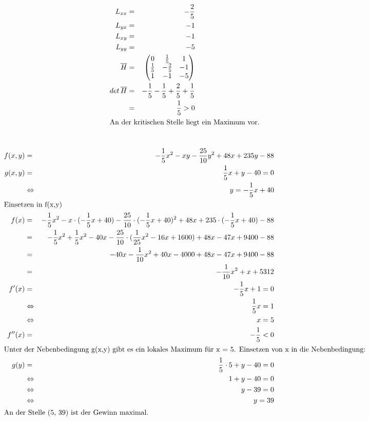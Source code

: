 \documentclass[10pt,a4paper,oneside,ngerman,numbers=noenddot]{scrartcl}
\begin{document}
\subsection{} %
\begin{alignat*}{2}
L_{xx} &=& - \frac{2}{5} \\
L_{yx} &=& - 1 \\
L_{xy} &=& - 1 \\
L_{yy} &=& - 5 \\
\overline{H} &=& \begin{pmatrix}0 & \frac{1}{5} & 1 \\
\frac{1}{5} & -\frac{2}{5} & -1\\
1 & -1 & -5 \end{pmatrix} \\
det \, \overline{H} &=& -\frac{1}{5} - \frac{1}{5} + \frac{2}{5} + \frac{1}{5} \\
&=& \frac{1}{5} > 0 \\
\intertext{An der kritischen Stelle liegt ein Maximum vor.}
\end{alignat*}
\section{} %
\begin{alignat*}{2}
f(x,y) &=& -\frac{1}{5}x^{2} - xy - \frac{25}{10}y^{2} + 48x + 235y - 88 \\
g(x,y) &=& \frac{1}{5}x + y -40 = 0 \\
&\Leftrightarrow & y = -\frac{1}{5}x + 40 \\
\intertext{Einsetzen in f(x,y)}
f(x) &=& -\frac{1}{5}x^{2} - x \cdot (-\frac{1}{5}x + 40) - \frac{25}{10} \cdot (-\frac{1}{5}x + 40)^{2} + 48x + 235 \cdot (-\frac{1}{5}x + 40) - 88 \\
&=& -\frac{1}{5}x^{2} + \frac{1}{5}x^{2} - 40x - \frac{25}{10} \cdot (\frac{1}{25}x^{2} -16x + 1600) + 48x -47x + 9400 - 88 \\
&=& - 40x - \frac{1}{10}x^{2} + 40x - 4000 + 48x -47x + 9400 - 88 \\
&=& - \frac{1}{10}x^{2} + x + 5312 \\
f'(x) &=& -\frac{1}{5}x + 1 = 0 \\
&\Leftrightarrow & \frac{1}{5}x = 1 \\
&\Leftrightarrow & x = 5 \\
f''(x) &=& -\frac{1}{5} < 0 \\
\intertext{Unter der Nebenbedingung g(x,y) gibt es ein lokales Maximum für x = 5.
Einsetzen von x in die Nebenbedingung:}
g(y) &=& \frac{1}{5} \cdot 5 + y -40 = 0 \\
&\Leftrightarrow & 1 + y - 40 = 0 \\
&\Leftrightarrow & y - 39 = 0 \\
&\Leftrightarrow & y = 39 \\
\intertext{An der Stelle (5, 39) ist der Gewinn maximal.}
\end{alignat*}
\end{document}
